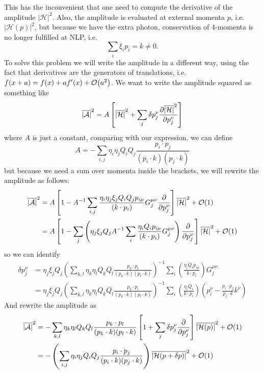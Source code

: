 \documentclass{article}
\begin{document}
This has the inconvenient that one need to compute the derivative of the amplitude $|\mathcal{H}|^2$. Also, the amplitude is evaluated at external momenta $p$, i.e. $|\mathcal{H}(p)|^2$, but because we have the extra photon, conservation of 4-momenta is no longer fulfilled at NLP, i.e. $$\sum_i \xi_i p_i = k \neq 0.$$
To solve this problem we will write the amplitude in a different way, using the fact that derivatives are the generators of translations, i.e. $f(x+a)=f(x)+af'(x)+\order{a^2}$. We want to write the amplitude squared as something like
\begin{equation}
	\overline{|\mathcal{A}|}^2 = A \left[\overline{|\mathcal{H}|}^2 + \sum_j \delta p_j^\nu \pdv{\overline{|\mathcal{H}|}^2}{p_j^\nu}\right]
\end{equation}
where $A$ is just a constant, comparing with our expression, we can define $$A=- \sum_{i, j} \eta_i \eta_j Q_i Q_j \frac{p_i \cdot p_j}{(p_i \cdot k)(p_j \cdot k)}$$but because we need a sum over momenta inside the brackets, we will rewrite the amplitude as follows:
\begin{align*}
	\overline{|\mathcal{A}|}^2 &= A\left[1 - A^{-1}\sum_{i,j} \frac{\eta_i \eta_j\xi_j Q_iQ_j p_{i\mu}}{(k\cdot p_i)} G_j^{\mu\nu}\pdv{p_j^\nu}\right]\overline{|\mathcal{H}|}^2+ \order{1}\\&
	=A\left[1 - \sum_j\left(\eta_j\xi_jQ_j A^{-1}\sum_{i} \frac{\eta_i Q_i p_{i\mu}}{(k\cdot p_i)} G_j^{\mu\nu}\right)\pdv{p_j^\nu}\right]\overline{|\mathcal{H}|}^2+ \order{1}
\end{align*}
so we can identify
\begin{align*}
	\delta p_j^\nu &= \eta_j\xi_jQ_j\left(\sum_{k, l} \eta_k \eta_l Q_k Q_l \frac{p_k \cdot p_l}{(p_k \cdot k)(p_l \cdot k)}\right)^{-1}\sum_{i} \left(\frac{\eta_i Q_i p_{i\mu}}{k\cdot p_i}\right) G_j^{\mu\nu}\\&
	=\eta_j\xi_jQ_j\left(\sum_{k, l} \eta_k \eta_l Q_k Q_l \frac{p_k \cdot p_l}{(p_k \cdot k)(p_l \cdot k)}\right)^{-1}\sum_{i} \left(\frac{\eta_i Q_i}{k\cdot p_i}\right)  \left(p_i^\nu - \frac{p_i\cdot p_j }{p_j\cdot k}k^\nu\right)
\end{align*}
And rewrite the amplitude as
\begin{align}\label{shifted amplitude}
	\overline{|\mathcal{A}|}^2 &=- \sum_{k, l} \eta_k \eta_l Q_k Q_l \frac{p_k \cdot p_l}{(p_k \cdot k)(p_l \cdot k)}\left[1 + \sum_j \delta p_j^\nu \pdv{p_j^\nu}\right]\overline{|\mathcal{H}(p)|}^2+ \order{1}\nonumber\\&
	=- \left(\sum_{i, j} \eta_i \eta_j Q_i Q_j \frac{p_i \cdot p_j}{(p_i \cdot k)(p_j \cdot k)}\right)\overline{|\mathcal{H}(p+\delta p)|}^2+ \order{1}
\end{align}
\end{document}
